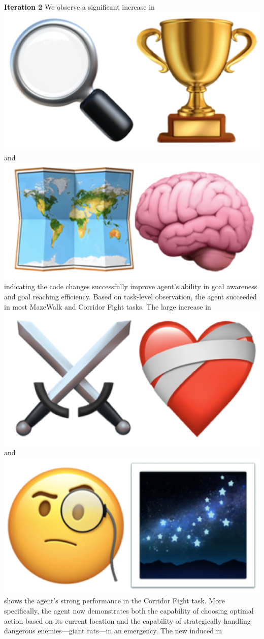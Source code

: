 \begin{flushleft}
\textbf{Iteration 2}
We observe a significant increase in \includegraphics[scale=0.07]{figs/emojis/mini_1.png} and \includegraphics[scale=0.07]{figs/emojis/mini_2.png} indicating the code changes successfully improve agent's ability in goal awareness and goal reaching efficiency. Based on task-level observation, the agent succeeded in most MazeWalk and Corridor Fight tasks. The large increase in \includegraphics[scale=0.07]{figs/emojis/mini_5.png} and \includegraphics[scale=0.07]{figs/emojis/mini_7.png} shows the agent's strong performance in the Corridor Fight task. More specifically, the agent now demonstrates both the capability of choosing optimal action based on its current location and the capability of strategically handling dangerous enemies—giant rats—in an emergency. The new induced m
\end{flushleft}
